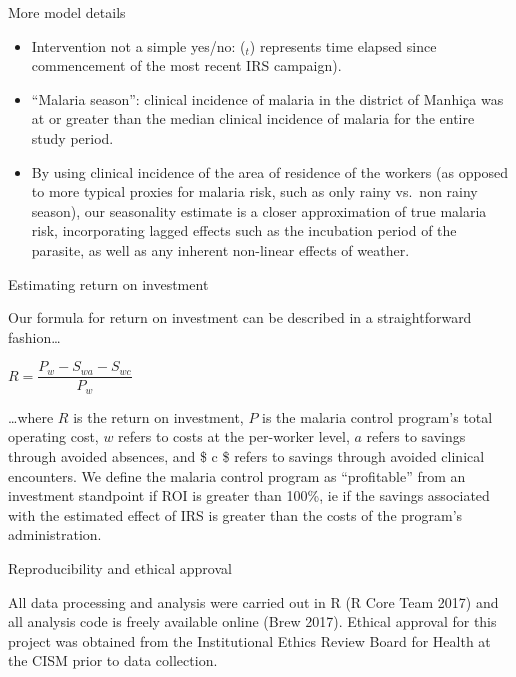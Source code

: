 \documentclass[ignorenonframetext,]{beamer}
\providecommand{\tightlist}{%
  \setlength{\itemsep}{0pt}\setlength{\parskip}{0pt}}
\begin{document}
\begin{frame}{More model details}

\begin{itemize}
\tightlist
\item
  Intervention not a simple yes/no: (\(_t\)) represents time elapsed
  since commencement of the most recent IRS campaign).\\
\item
  ``Malaria season'': clinical incidence of malaria in the district of
  Manhiça was at or greater than the median clinical incidence of
  malaria for the entire study period.\\
\item
  By using clinical incidence of the area of residence of the workers
  (as opposed to more typical proxies for malaria risk, such as only
  rainy vs.~non rainy season), our seasonality estimate is a closer
  approximation of true malaria risk, incorporating lagged effects such
  as the incubation period of the parasite, as well as any inherent
  non-linear effects of weather.
\end{itemize}

\end{frame}

\begin{frame}{Estimating return on investment}

Our formula for return on investment can be described in a
straightforward fashion\ldots{}

\begin{center}
$R = \dfrac{P_{w} - S_{wa} - S_{wc}}{P_{w}}$

\end{center}

\ldots{}where \(R\) is the return on investment, \(P\) is the malaria
control program's total operating cost, \(w\) refers to costs at the
per-worker level, \(a\) refers to savings through avoided absences, and
\$ c \$ refers to savings through avoided clinical encounters. We define
the malaria control program as ``profitable'' from an investment
standpoint if ROI is greater than 100\%, ie if the savings associated
with the estimated effect of IRS is greater than the costs of the
program's administration.

\end{frame}

\begin{frame}{Reproducibility and ethical approval}

All data processing and analysis were carried out in R (R Core Team
2017) and all analysis code is freely available online (Brew 2017).
Ethical approval for this project was obtained from the Institutional
Ethics Review Board for Health at the CISM prior to data collection.

\end{frame}
\end{document}
